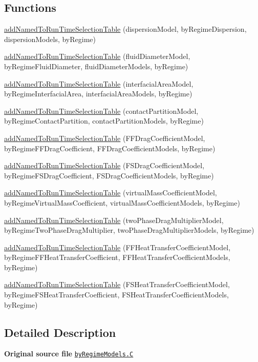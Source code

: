 \subsection*{Functions}
\begin{DoxyCompactItemize}
\item 
\hyperlink{namespaceFoam_a3ccb5c66cc9e2620dafa40206f10fb24}{add\+Named\+To\+Run\+Time\+Selection\+Table} (dispersion\+Model, by\+Regime\+Dispersion, dispersion\+Models, by\+Regime)
\item 
\hyperlink{namespaceFoam_ae6dc962da9b750dd5dee5ca408907857}{add\+Named\+To\+Run\+Time\+Selection\+Table} (fluid\+Diameter\+Model, by\+Regime\+Fluid\+Diameter, fluid\+Diameter\+Models, by\+Regime)
\item 
\hyperlink{namespaceFoam_ae7e2097d0a584acfc284ceab171b8086}{add\+Named\+To\+Run\+Time\+Selection\+Table} (interfacial\+Area\+Model, by\+Regime\+Interfacial\+Area, interfacial\+Area\+Models, by\+Regime)
\item 
\hyperlink{namespaceFoam_a34610b4a5b5f3425797115f7a75c0a68}{add\+Named\+To\+Run\+Time\+Selection\+Table} (contact\+Partition\+Model, by\+Regime\+Contact\+Partition, contact\+Partition\+Models, by\+Regime)
\item 
\hyperlink{namespaceFoam_a8af99dfd1efcd5e7b22d931bfd9b1f07}{add\+Named\+To\+Run\+Time\+Selection\+Table} (F\+F\+Drag\+Coefficient\+Model, by\+Regime\+F\+F\+Drag\+Coefficient, F\+F\+Drag\+Coefficient\+Models, by\+Regime)
\item 
\hyperlink{namespaceFoam_a742e184c4e1a139f4f53ad6661d6862e}{add\+Named\+To\+Run\+Time\+Selection\+Table} (F\+S\+Drag\+Coefficient\+Model, by\+Regime\+F\+S\+Drag\+Coefficient, F\+S\+Drag\+Coefficient\+Models, by\+Regime)
\item 
\hyperlink{namespaceFoam_a41eb49f4772d802035bff9ecb04daf61}{add\+Named\+To\+Run\+Time\+Selection\+Table} (virtual\+Mass\+Coefficient\+Model, by\+Regime\+Virtual\+Mass\+Coefficient, virtual\+Mass\+Coefficient\+Models, by\+Regime)
\item 
\hyperlink{namespaceFoam_a804d4da78862afb8e192d8f5d0bc0106}{add\+Named\+To\+Run\+Time\+Selection\+Table} (two\+Phase\+Drag\+Multiplier\+Model, by\+Regime\+Two\+Phase\+Drag\+Multiplier, two\+Phase\+Drag\+Multiplier\+Models, by\+Regime)
\item 
\hyperlink{namespaceFoam_a4b7ad4384b875ad93b69f5aed280878f}{add\+Named\+To\+Run\+Time\+Selection\+Table} (F\+F\+Heat\+Transfer\+Coefficient\+Model, by\+Regime\+F\+F\+Heat\+Transfer\+Coefficient, F\+F\+Heat\+Transfer\+Coefficient\+Models, by\+Regime)
\item 
\hyperlink{namespaceFoam_a429bfa504c604c49f2499d9f09fab11f}{add\+Named\+To\+Run\+Time\+Selection\+Table} (F\+S\+Heat\+Transfer\+Coefficient\+Model, by\+Regime\+F\+S\+Heat\+Transfer\+Coefficient, F\+S\+Heat\+Transfer\+Coefficient\+Models, by\+Regime)
\end{DoxyCompactItemize}


\subsection{Detailed Description}
{\bfseries Original source file} \href{../../../home/carlo/data/GeN-Foam/GeN-Foam_ffn/GeN-Foam/GeN-Foam/classes/thermalHydraulics/src/physicsModels/templatedModels/byRegime/byRegimeModels.C}{\tt by\+Regime\+Models.\+C} 